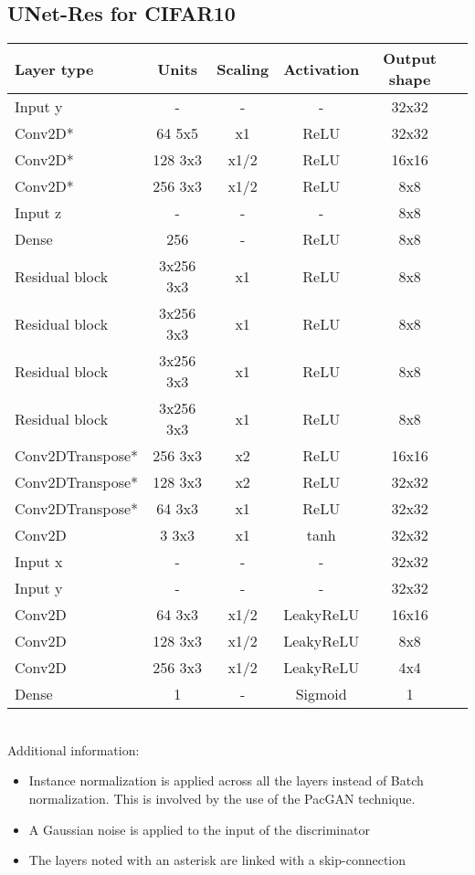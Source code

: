 {\subsection{UNet-Res for CIFAR10} \label{subsec:Unet-Cifar}
{
	\centering
	\begin{tabular}{|l|c|c|c|c|c|}
		\hline
		Layer type & Units & Scaling & Activation & Output shape\\
		\hline
		Input y & - & - & - & 32x32\\
		Conv2D* & 64 5x5 & x1 & ReLU & 32x32 \\
		Conv2D* & 128 3x3 & x1/2 & ReLU & 16x16 \\
		Conv2D* & 256 3x3 & x1/2 & ReLU & 8x8 \\
		Input z & - & - & - & 8x8\\
		Dense & 256 & - & ReLU & 8x8\\
		Residual block & 3x256 3x3 & x1 & ReLU & 8x8 \\
		Residual block & 3x256 3x3 & x1 & ReLU & 8x8 \\
		Residual block & 3x256 3x3 & x1 & ReLU & 8x8 \\
		Residual block & 3x256 3x3 & x1 & ReLU & 8x8 \\
		Conv2DTranspose* & 256 3x3 & x2 & ReLU & 16x16 \\
		Conv2DTranspose* & 128 3x3 & x2 & ReLU & 32x32 \\
		Conv2DTranspose* & 64 3x3 & x1 & ReLU & 32x32 \\
		Conv2D & 3 3x3 & x1 & tanh & 32x32 \\
		\hline
		Input x & - & - & - & 32x32\\
		Input y & - & - & - & 32x32\\
		Conv2D & 64 3x3 & x1/2 & LeakyReLU & 16x16 \\
		Conv2D & 128 3x3 & x1/2 & LeakyReLU & 8x8 \\
		Conv2D & 256 3x3 & x1/2 & LeakyReLU & 4x4 \\
		Dense & 1 & - & Sigmoid & 1\\
		\hline
	\end{tabular}
}\\ 

Additional information: \begin{itemize}
	\item Instance normalization \citep{Ulyanov2016} is applied across all the layers instead of Batch normalization. This is involved by the use of the PacGAN technique.
	\item A Gaussian noise is applied to the input of the discriminator
	\item The layers noted with an asterisk are linked with a skip-connection
\end{itemize}


}

